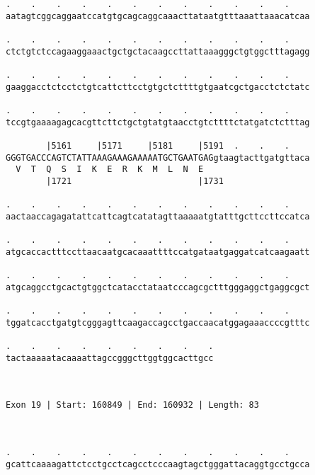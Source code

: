\documentclass{article}
\begin{document}
\begin{Verbatim}
.    .    .    .    .    .    .    .    .    .    .    .    
aatagtcggcaggaatccatgtgcagcaggcaaacttataatgtttaaattaaacatcaa
                                                            
.    .    .    .    .    .    .    .    .    .    .    .    
ctctgtctccagaaggaaactgctgctacaagccttattaaagggctgtggctttagagg
                                                            
.    .    .    .    .    .    .    .    .    .    .    .    
gaaggacctctcctctgtcattcttcctgtgctcttttgtgaatcgctgacctctctatc
                                                            
.    .    .    .    .    .    .    .    .    .    .    .    
tccgtgaaaagagcacgttcttctgctgtatgtaacctgtcttttctatgatctctttag
                                                            
        |5161     |5171     |5181     |5191  .    .    .    
GGGTGACCCAGTCTATTAAAGAAAGAAAAATGCTGAATGAGgtaagtacttgatgttaca
  V  T  Q  S  I  K  E  R  K  M  L  N  E                     
        |1721                         |1731                 
  
.    .    .    .    .    .    .    .    .    .    .    .    
aactaaccagagatattcattcagtcatatagttaaaaatgtatttgcttccttccatca
                                                            
.    .    .    .    .    .    .    .    .    .    .    .    
atgcaccactttccttaacaatgcacaaattttccatgataatgaggatcatcaagaatt
                                                            
.    .    .    .    .    .    .    .    .    .    .    .    
atgcaggcctgcactgtggctcatacctataatcccagcgctttgggaggctgaggcgct
                                                            
.    .    .    .    .    .    .    .    .    .    .    .    
tggatcacctgatgtcgggagttcaagaccagcctgaccaacatggagaaaccccgtttc
                                                            
.    .    .    .    .    .    .    .    .
tactaaaaatacaaaattagccgggcttggtggcacttgcc
                                         
                                         
 
Exon 19 | Start: 160849 | End: 160932 | Length: 83



.    .    .    .    .    .    .    .    .    .    .    .    
gcattcaaaagattctcctgcctcagcctcccaagtagctgggattacaggtgcctgcca
                                                            

\end{Verbatim}
\end{document}
